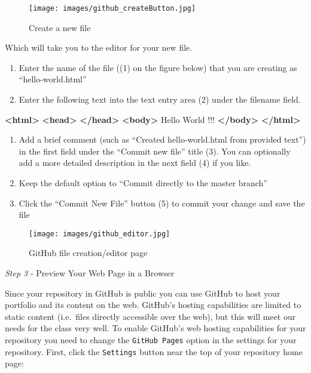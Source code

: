 \documentclass[]{book}
\newenvironment{Shaded}{}{}
\newcommand{\KeywordTok}[1]{\textcolor[rgb]{0.00,0.44,0.13}{\textbf{{#1}}}}
\newcommand{\NormalTok}[1]{{#1}}
\begin{document}
\begin{figure}[htbp]
\centering
\texttt{[image: images/github\_createButton.jpg]}
\caption{Create a new file}
\end{figure}

Which will take you to the editor for your new file.

\begin{enumerate}
\def\labelenumi{\arabic{enumi}.}
\setcounter{enumi}{2}
\item
  Enter the name of the file ((1) on the figure below) that you are
  creating as ``hello-world.html''
\item
  Enter the following text into the text entry area (2) under the
  filename field.
\end{enumerate}

\begin{Shaded}
\begin{Highlighting}[numbers=left,,]
\KeywordTok{<html>}
    \KeywordTok{<head>}
    \KeywordTok{</head>}     
    \KeywordTok{<body>}
        \NormalTok{Hello World !!!}
    \KeywordTok{</body>} 
\KeywordTok{</html>}
\end{Highlighting}
\end{Shaded}

\begin{enumerate}
\def\labelenumi{\arabic{enumi}.}
\setcounter{enumi}{4}
\item
  Add a brief comment (such as ``Created hello-world.html from provided
  text'') in the first field under the ``Commit new file'' title (3).
  You can optionally add a more detailed description in the next field
  (4) if you like.
\item
  Keep the default option to ``Commit directly to the master branch''
\item
  Click the ``Commit New File'' button (5) to commit your change and
  save the file
\end{enumerate}

\begin{figure}[htbp]
\centering
\texttt{[image: images/github\_editor.jpg]}
\caption{GitHub file creation/editor page}
\end{figure}

\emph{Step 3} - Preview Your Web Page in a Browser

Since your repository in GitHub is public you can use GitHub to host
your portfolio and its content on the web. GitHub's hosting capabilities
are limited to static content (i.e.~files directly accessible over the
web), but this will meet our needs for the class very well. To enable
GitHub's web hosting capabilities for your repository you need to change
the \texttt{GitHub\ Pages} option in the settings for your repository.
First, click the \texttt{Settings} button near the top of your
repository home page:
\end{document}
